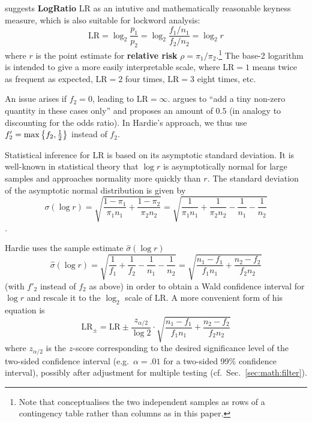 \documentclass[a4paper]{article}
\newcommand{\LR}{\text{LR}}     %
\begin{document}
\citet[45]{Hardie:14} suggests \textbf{LogRatio} $\LR$ as an intutive and mathematically reasonable keyness measure, which is also suitable for lockword analysis:
\begin{equation}
  \label{eq:log-ratio}
  \LR = \log_2 \frac{p_1}{p_2} = \log_2 \frac{f_1 / n_1}{f_2 / n_2} = \log_2 r
\end{equation}
where $r$ is the point estimate for \textbf{relative risk} $\rho = \pi_1 / \pi_2$.\footnote{Note that \citet{Hardie:14} conceptualises the two independent samples as rows of a contingency table rather than columns as in this paper.} The base-2 logarithm is intended to give a more easily interpretable scale, where $\LR = 1$ means twice as frequent as expected, $\LR = 2$ four times, $\LR = 3$ eight times, etc.

An issue arises if $f_2 = 0$, leading to $\LR = \infty$. \citet[45]{Hardie:14} argues to ``add a tiny non-zero quantity in these cases only'' and proposes an amount of $0.5$ (in analogy to discounting for the odds ratio). In Hardie's approach, we thus use $f'_2 = \max \left\{f_2, \frac12\right\}$ instead of $f_2$.

Statistical inference for $\LR$ is based on its asymptotic standard deviation.  It is well-known in statistical theory that $\log r$ is asymptotically normal for large samples and approaches normality more quickly than $r$. The standard deviation of the asymptotic normal distribution is given by
\begin{equation}
  \label{eq:log-ratio-sd}
  \sigma(\log r) = \sqrt{
    \frac{1 - \pi_1}{\pi_1 n_1} +
    \frac{1 - \pi_2}{\pi_2 n_2}
  }
  = \sqrt{
    \frac{1}{\pi_1 n_1} + \frac{1}{\pi_2 n_2}
    - \frac{1}{n_1} - \frac{1}{n_2}
  }
\end{equation}
\citep[73]{Agresti:02}.  

Hardie uses the sample estimate $\hat{\sigma}(\log r)$ 
\begin{equation}
  \label{eq:log-ratio-sd-estimate}
  \hat{\sigma}(\log r) = \sqrt{
    \frac{1}{f_1} + \frac{1}{f_2}
    - \frac{1}{n_1} - \frac{1}{n_2}
  }
  = \sqrt{
    \frac{n_1 - f_1}{f_1  n_1} + \frac{n_2 - f_2}{f_2 n_2}
  }
\end{equation}
(with $f'_2$ instead of $f_2$ as above) in order to obtain a Wald confidence interval for $\log r$ and rescale it to the $\log_2$ scale of $\LR$.  A more convenient form of his equation is
\begin{equation}
  \label{eq:log-ratio-conf-hardie}
  \LR_{\pm} = \LR \pm \frac{z_{\alpha/2}}{\log 2} \cdot \sqrt{
    \frac{n_1 - f_1}{f_1  n_1} + \frac{n_2 - f_2}{f_2 n_2}
  }
\end{equation}
where $z_{\alpha/2}$ is the $z$-score corresponding to the desired significance level of the two-sided confidence interval (e.g.\ $\alpha = .01$ for a two-sided 99\% confidence interval), possibly after adjustment for multiple testing (cf.\ Sec.~\ref{sec:math:filter}).
\end{document}
